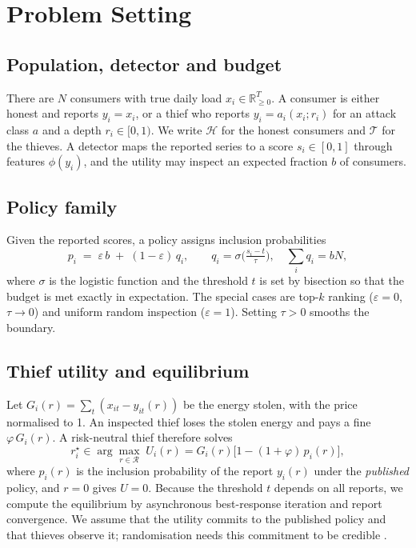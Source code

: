 \documentclass[journal]{IEEEtran}
\begin{document}
\section{Problem Setting}\label{sec:model}
\subsection{Population, detector and budget}
There are $N$ consumers with true daily load $x_i\in\mathbb{R}_{\ge0}^T$. A consumer is either honest and reports $y_i=x_i$, or a thief who reports $y_i=a_i(x_i;r_i)$ for an attack class $a$ and a depth $r_i\in[0,1)$. We write $\mathcal H$ for the honest consumers and $\mathcal T$ for the thieves. A detector maps the reported series to a score $s_i\in[0,1]$ through features $\phi(y_i)$, and the utility may inspect an expected fraction $b$ of consumers.

\subsection{Policy family}
Given the reported scores, a policy assigns inclusion probabilities
\begin{equation}
p_i \;=\; \varepsilon\, b \;+\; (1-\varepsilon)\, q_i,\qquad q_i=\sigma\!\Big(\tfrac{s_i-t}{\tau}\Big),\quad \sum_i q_i=bN,
\label{eq:policy}
\end{equation}
where $\sigma$ is the logistic function and the threshold $t$ is set by bisection so that the budget is met exactly in expectation. The special cases are top-$k$ ranking ($\varepsilon=0$, $\tau\to0$) and uniform random inspection ($\varepsilon=1$). Setting $\tau>0$ smooths the boundary.

\subsection{Thief utility and equilibrium}
Let $G_i(r)=\sum_t (x_{it}-y_{it}(r))$ be the energy stolen, with the price normalised to 1. An inspected thief loses the stolen energy and pays a fine $\varphi\,G_i(r)$. A risk-neutral thief therefore solves
\begin{equation}
r_i^\star \in \arg\max_{r\in\mathcal{R}} \; U_i(r)=G_i(r)\big[1-(1+\varphi)\,p_i(r)\big],
\label{eq:utility}
\end{equation}
where $p_i(r)$ is the inclusion probability of the report $y_i(r)$ under the \emph{published} policy, and $r=0$ gives $U=0$. Because the threshold $t$ depends on all reports, we compute the equilibrium by asynchronous best-response iteration and report convergence. We assume that the utility commits to the published policy and that thieves observe it; randomisation needs this commitment to be credible \cite{braverman2020}.
\end{document}
